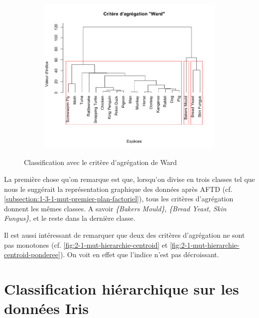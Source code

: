 \documentclass[a4paper,10pt]{report}
\begin{document}
\begin{figure}[H]
	\centering
	\captionsetup{justification=centering, margin=3cm}
	\begin{subfigure}[b]{0.4\linewidth}
		\centering
		\captionsetup{justification=centering}
		\includegraphics[width=1\linewidth]{img/2-1-mut-hierarchie-ward}
		\label{fig:2-1-mut-hierarchie-ward}
	\end{subfigure}%
	\caption{\small Classification avec le critère d'agrégation de Ward}
	\label{fig:2-1-classification-mut-ward}%
\end{figure}



La première chose qu'on remarque est que, lorsqu'on divise en trois classes tel que nous le suggérait la représentation graphique des données après AFTD (cf. \autoref{subsection:1-3-1-mut-premier-plan-factoriel}), tous les critères d'agrégation donnent les mêmes classes. A savoir \textit{\{Bakers Mould\}}, \textit{\{Bread Yeast, Skin Fungus\}}, et le reste dans la dernière classe.

Il est aussi intéressant de remarquer que deux des critères d'agrégation ne sont pas monotones (cf. \autoref{fig:2-1-mut-hierarchie-centroid} et \autoref{fig:2-1-mut-hierarchie-centroid-ponderee}). On voit en effet que l'indice n'est pas décroissant.



\section{Classification hiérarchique sur les données Iris}
\end{document}
